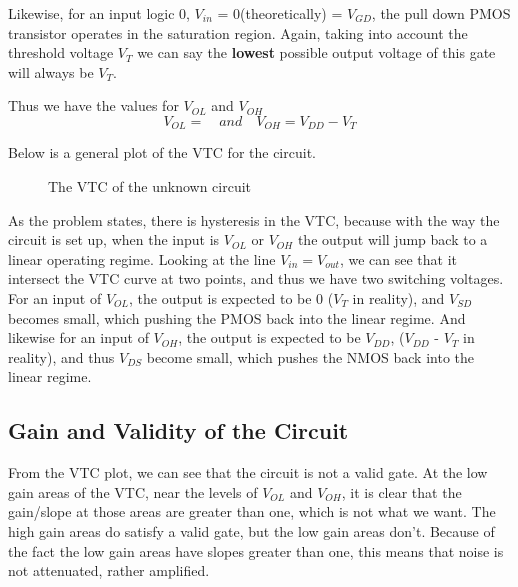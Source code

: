 \documentclass[12pt]{article}
\begin{document}
Likewise, for an input logic 0, $V_{in}$ = 0(theoretically) = $V_{GD}$, the pull down PMOS transistor operates in the saturation region. 
Again, taking into account the threshold voltage $V_T$ we can say the \textbf{lowest} possible output voltage of this gate will always be $V_T$.

Thus we have the values for $V_{OL}$ and $V_{OH}$
\[V_{OL} = \quad and \quad V_{OH} = V_{DD} - V_T\]

Below is a general plot of the VTC for the circuit.
\begin{figure} [H]
    \centering
    \caption{The VTC of the unknown circuit}
\end {figure}
As the problem states, there is hysteresis in the VTC, because with the way the circuit is set up, when the input is $V_{OL}$ or $V_{OH}$ the output
will jump back to a linear operating regime. Looking at the line $V_{in} = V_{out}$, we can see that it intersect the VTC curve at two points, and
thus we have two switching voltages. For an input of $V_{OL}$, the output is expected to be 0 ($V_T$ in reality), and $V_{SD}$ becomes small, which
pushing the PMOS back into the linear regime. And likewise for an input of $V_{OH}$, the output is expected to be $V_{DD}$, ($V_{DD}$ - $V_T$ in reality),
and thus $V_{DS}$ become small, which pushes the NMOS back into the linear regime.
\subsection{Gain and Validity of the Circuit}
From the VTC plot, we can see that the circuit is not a valid gate. At the low gain areas of the VTC, near the levels of $V_{OL}$ and $V_{OH}$, it
is clear that the gain/slope at those areas are greater than one, which is not what we want. The high gain areas do satisfy a valid gate, but the
low gain areas don't. Because of the fact the low gain areas have slopes greater than one, this means that noise is not attenuated, rather amplified.
\end{document}
